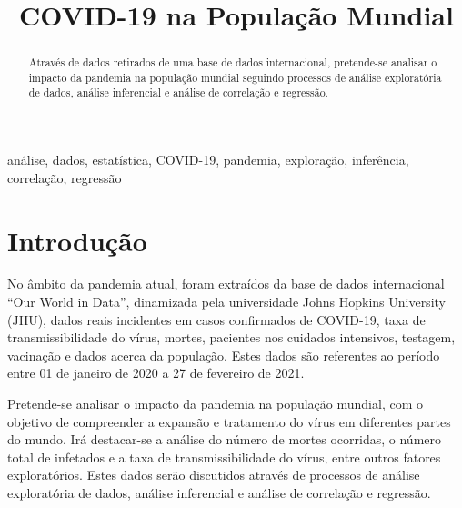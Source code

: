 \documentclass[conference]{IEEEtran}
\begin{document}
\title{COVID-19 na População Mundial\\
}

\author{
\and
{}
}

\maketitle

\begin{abstract}
Através de dados retirados de uma base de dados internacional, pretende-se analisar o impacto da pandemia na população mundial seguindo processos de análise exploratória de dados, análise inferencial e análise de correlação e regressão.
\end{abstract}

\begin{IEEEkeywords}
análise, dados, estatística, COVID-19, pandemia, exploração, inferência, correlação, regressão
\end{IEEEkeywords}

\section{Introdução} 
No âmbito da pandemia atual, foram extraídos da base de dados internacional “Our World in Data”\cite{b1}, dinamizada pela universidade Johns Hopkins University (JHU), dados reais incidentes em casos confirmados de COVID-19, taxa de transmissibilidade do vírus, mortes, pacientes nos cuidados intensivos, testagem, vacinação e dados acerca da população. Estes dados são referentes ao período entre 01 de janeiro de 2020 a 27 de fevereiro de 2021.

Pretende-se analisar o impacto da pandemia na população mundial, com o objetivo de compreender a expansão e tratamento do vírus em diferentes partes do mundo. Irá destacar-se a análise do número de mortes ocorridas, o número total de infetados e a taxa de transmissibilidade do vírus, entre outros fatores exploratórios. Estes dados serão discutidos através de processos de análise exploratória de dados, análise inferencial e análise de correlação e regressão.
\end{document}
